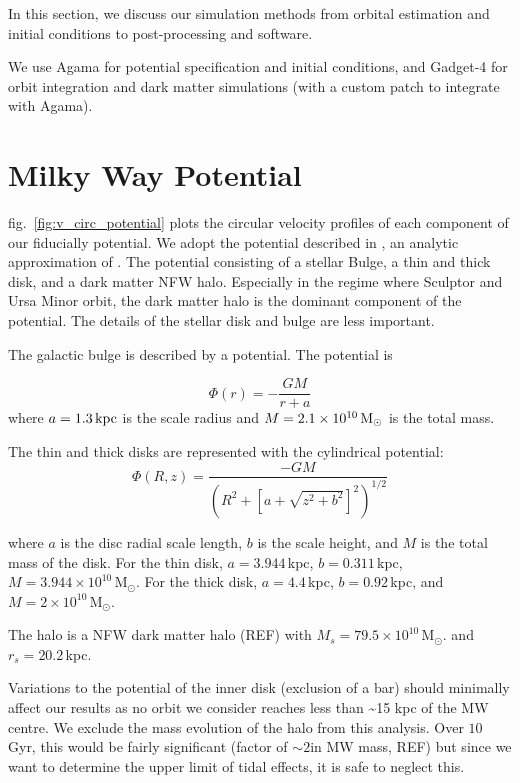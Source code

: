 In this section, we discuss our simulation methods from orbital
estimation and initial conditions to post-processing and software.

We use Agama \citep{agama} for potential specification and initial
conditions, and Gadget-4 \citep{gadget4} for orbit integration and dark
matter simulations (with a custom patch to integrate with Agama).

\section{Milky Way Potential}\label{milky-way-potential}

fig.~\ref{fig:v_circ_potential} plots the circular velocity profiles of
each component of our fiducially potential. We adopt the potential
described in \citet{EP2020}, an analytic approximation of
\citet{mcmillan2011}. The potential consisting of a stellar Bulge, a
thin and thick disk, and a dark matter NFW halo. Especially in the
regime where Sculptor and Ursa Minor orbit, the dark matter halo is the
dominant component of the potential. The details of the stellar disk and
bulge are less important.

The galactic bulge is described by a \citet{hernquist1990} potential.
The potential is

\begin{equation}
\Phi(r) = - \frac{GM}{r + a}
\end{equation} where \(a=1.3\,{\rm kpc}\) is the scale radius and
\(M=2.1 \times 10^{10}\,{\rm M}_{\odot}\) is the total mass.

The thin and thick disks are represented with the
\citet{miyamoto+nagai1975} cylindrical potential: \begin{equation}
\Phi(R, z) = \frac{-GM}{\left(R^2 + \left[a + \sqrt{z^2 + b^2}\right]^{2}\right)^{1/2}}
\end{equation}

where \(a\) is the disc radial scale length, \(b\) is the scale height,
and \(M\) is the total mass of the disk. For the thin disk,
\(a=3.944\,\)kpc, \(b=0.311\,\)kpc,
\(M=3.944\times10^{10}\,\)M\(_\odot\). For the thick disk,
\(a=4.4\,\)kpc, \(b=0.92\,\)kpc, and \(M=2\times10^{10}\,\)M\(_\odot\).

The halo is a NFW dark matter halo (REF) with
\(M_s=79.5\times10^{10}\,\)M\(_\odot\). and \(r_s = 20.2\,\)kpc.

Variations to the potential of the inner disk (exclusion of a bar)
should minimally affect our results as no orbit we consider reaches less
than \textasciitilde15 kpc of the MW centre. We exclude the mass
evolution of the halo from this analysis. Over \(10\,\)Gyr, this would
be fairly significant (factor of \(\sim 2\)in MW mass, REF) but since we
want to determine the upper limit of tidal effects, it is safe to
neglect this.

